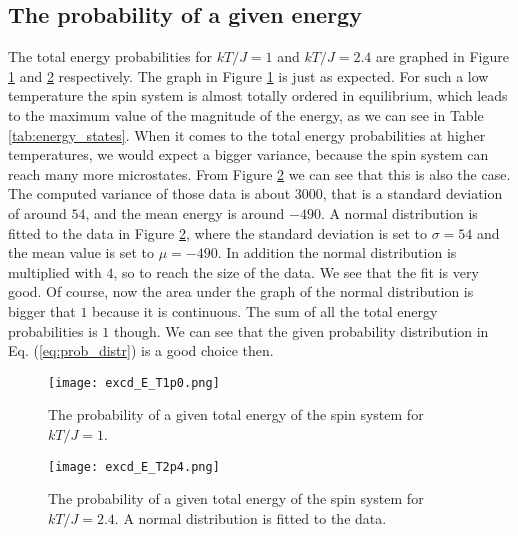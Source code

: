 \documentclass[12pt]{article}
\begin{document}
\begin{flushleft}
\subsection{The probability of a given energy}
The total energy probabilities for $kT/J = 1$ and $kT/J=2.4$ are graphed in Figure \ref{fig:E_prob_t1p0} and \ref{fig:E_prob_t2p4} respectively. The graph in Figure \ref{fig:E_prob_t1p0} is just as expected. For such a low temperature the spin system is almost totally ordered in equilibrium, which leads to the maximum value of the magnitude of the energy, as we can see in Table \ref{tab:energy_states}. When it comes to the total energy probabilities at higher temperatures, we would expect a bigger variance, because the spin system can reach many more microstates. From Figure \ref{fig:E_prob_t2p4} we can see that this is also the case. The computed variance of those data is about $3000$, that is a standard deviation of around $54$, and the mean energy is around $-490$. A normal distribution is fitted to the data in Figure \ref{fig:E_prob_t2p4}, where the standard deviation is set to $\sigma = 54$ and the mean value is set to $\mu =  -490$. In addition the normal distribution is multiplied with $4$, so to reach the size of the data. We see that the fit is very good. Of course, now the area under the graph of the normal distribution is bigger that $1$ because it is continuous. The sum of all the total energy probabilities is $1$ though. We can see that the given probability distribution in Eq. (\ref{eq:prob_distr}) is a good choice then.  

\begin{figure}[!h]
\begin{center}
\texttt{[image: excd\_E\_T1p0.png]}
\caption{\label{fig:E_prob_t1p0}The probability of a given total energy of the spin system for $kT/J=1$.}
\end{center}
\end{figure}

\begin{figure}[!h]
\begin{center}
\texttt{[image: excd\_E\_T2p4.png]}
\caption{\label{fig:E_prob_t2p4}The probability of a given total energy of the spin system for $kT/J=2.4$. A normal distribution is fitted to the data.}
\end{center}
\end{figure}

\newpage

\end{flushleft}
\end{document}
